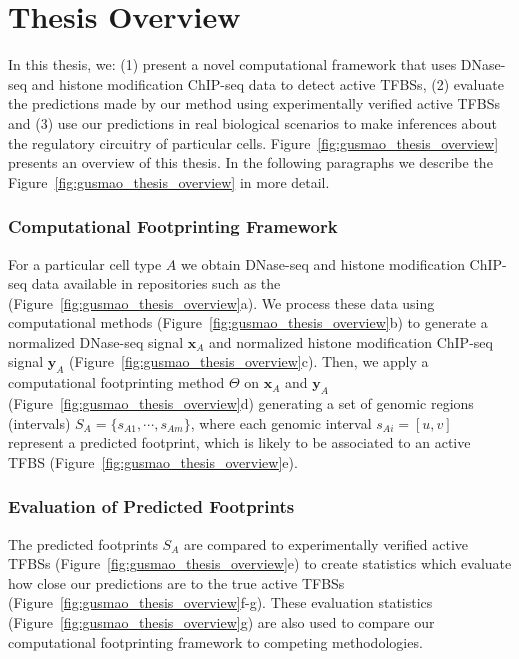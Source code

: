 \section{Thesis Overview}
\label{sec:thesis.overview}

In this thesis, we: (1) present a novel computational framework that uses DNase-seq and histone modification ChIP-seq data to detect active TFBSs, (2) evaluate the predictions made by our method using experimentally verified active TFBSs and (3) use our predictions in real biological scenarios to make inferences about the regulatory circuitry of particular cells. Figure~\ref{fig:gusmao_thesis_overview} presents an overview of this thesis. In the following paragraphs we describe the Figure~\ref{fig:gusmao_thesis_overview} in more detail.

\subsubsection{Computational Footprinting Framework}

For a particular cell type $A$ we obtain DNase-seq and histone modification ChIP-seq data available in repositories such as the~\cite{encode2012} (Figure~\ref{fig:gusmao_thesis_overview}a). We process these data using computational methods (Figure~\ref{fig:gusmao_thesis_overview}b) to generate a normalized DNase-seq signal $\mathbf{x}_A$ and normalized histone modification ChIP-seq signal $\mathbf{y}_A$ (Figure~\ref{fig:gusmao_thesis_overview}c). Then, we apply a computational footprinting method $\Theta$ on $\mathbf{x}_A$ and $\mathbf{y}_A$ (Figure~\ref{fig:gusmao_thesis_overview}d) generating a set of genomic regions (intervals) $S_A = \{s_{A1}, \cdots, s_{Am}\}$, where each genomic interval $s_{Ai} = [u,v]$ represent a predicted footprint, which is likely to be associated to an active TFBS (Figure~\ref{fig:gusmao_thesis_overview}e).

\subsubsection{Evaluation of Predicted Footprints}

The predicted footprints $S_A$ are compared to experimentally verified active TFBSs (Figure~\ref{fig:gusmao_thesis_overview}e) to create statistics which evaluate how close our predictions are to the true active TFBSs (Figure~\ref{fig:gusmao_thesis_overview}f-g). These evaluation statistics (Figure~\ref{fig:gusmao_thesis_overview}g) are also used to compare our computational footprinting framework to competing methodologies. 

